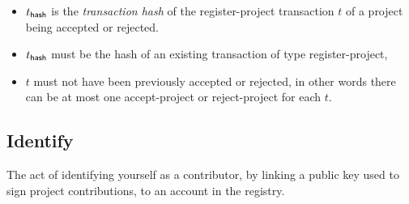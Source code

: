 \columnbreak
{}
\begin{itemize}
    \item $t_{\mathsf{hash}}$ is the \emph{transaction hash} of the
        \textsf{register\hbox{-}project} transaction $t$ of a project
        being accepted or rejected.
\end{itemize}
\validation
\begin{itemize}
    \item $t_{\mathsf{hash}}$ must be the hash of an existing transaction of
        type \textsf{register\hbox{-}project},
    \item $t$ must not have been previously accepted or rejected, in other
        words there can be at most one \textsf{accept\hbox{-}project} or
        \textsf{reject\hbox{-}project} for each $t$.
\end{itemize}

\subsection{Identify}
The act of identifying yourself as a contributor, by linking a public key used
to sign project contributions, to an account in the registry.

